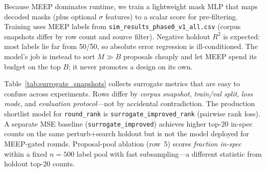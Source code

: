\documentclass[11pt,a4paper]{article}
\begin{document}
Because MEEP dominates runtime, we train a lightweight mask MLP that maps decoded masks (plus optional $\sigma$ features) to a scalar score for pre-filtering.
Training uses MEEP labels from \texttt{sim\_results\_phase0\_v1\_all.csv} (corpus snapshots differ by row count and source filter).
Negative holdout $R^2$ is expected: most labels lie far from 50/50, so absolute error regression is ill-conditioned.
The model's job is instead to sort $M \gg B$ proposals cheaply and let MEEP spend its budget on the top $B$; it never promotes a design on its own.

Table~\ref{tab:surrogate_snapshots} collects surrogate metrics that are easy to confuse across experiments.
Rows differ by \emph{corpus snapshot}, \emph{train/val split}, \emph{loss mode}, and \emph{evaluation protocol}---not by accidental contradiction.
The production shortlist model for \texttt{round\_rank} is \texttt{surrogate\_improved\_rank} (pairwise rank loss).
A separate MSE baseline (\texttt{surrogate\_improved}) achieves higher top-20 in-spec counts on the same perturb+search holdout but is not the model deployed for MEEP-gated rounds.
Proposal-pool ablation (row~5) scores \emph{fraction in-spec} within a fixed $n{=}500$ label pool with fast subsampling---a different statistic from holdout top-20 counts.
\end{document}
